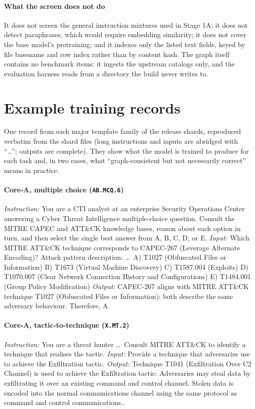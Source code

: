 \documentclass[twocolumn]{svjour3}
\begin{document}
\begin{appendix}
\paragraph{What the screen does not do}
It does not screen the general instruction mixtures used in Stage 1A; it does not detect paraphrases, which would require embedding similarity; it does not cover the base model's pretraining; and it indexes only the listed text fields, keyed by file basename and row index rather than by content hash. The graph itself contains no benchmark items: it ingests the upstream catalogs only, and the evaluation harness reads from a directory the build never writes to.

\section{Example training records}\label{app:examples}
One record from each major template family of the release shards, reproduced verbatim from the shard files (long instructions and inputs are abridged with ``\ldots''; outputs are complete). They show what the model is trained to produce for each task and, in two cases, what ``graph-consistent but not necessarily correct'' means in practice.

\paragraph{Core-A, multiple choice (\texttt{AB.MCQ.6})}
\emph{Instruction:} You are a CTI analyst at an enterprise Security Operations Center answering a Cyber Threat Intelligence multiple-choice question. Consult the MITRE CAPEC and ATT\&CK knowledge bases, reason about each option in turn, and then select the single best answer from A, B, C, D, or E.
\emph{Input:} Which MITRE ATT\&CK technique corresponds to CAPEC-267 (Leverage Alternate Encoding)? Attack pattern description: \ldots\ A) T1027 (Obfuscated Files or Information) B) T1673 (Virtual Machine Discovery) C) T1587.004 (Exploits) D) T1070.007 (Clear Network Connection History and Configurations) E) T1484.001 (Group Policy Modification)
\emph{Output:} CAPEC-267 aligns with MITRE ATT\&CK technique T1027 (Obfuscated Files or Information); both describe the same adversary behaviour. Therefore, A.

\paragraph{Core-A, tactic-to-technique (\texttt{X.MT.2})}
\emph{Instruction:} You are a threat hunter \ldots\ Consult MITRE ATT\&CK to identify a technique that realises the tactic.
\emph{Input:} Provide a technique that adversaries use to achieve the Exfiltration tactic.
\emph{Output:} Technique T1041 (Exfiltration Over C2 Channel) is used to achieve the Exfiltration tactic: Adversaries may steal data by exfiltrating it over an existing command and control channel. Stolen data is encoded into the normal communications channel using the same protocol as command and control communications..


\end{appendix}
\end{document}
